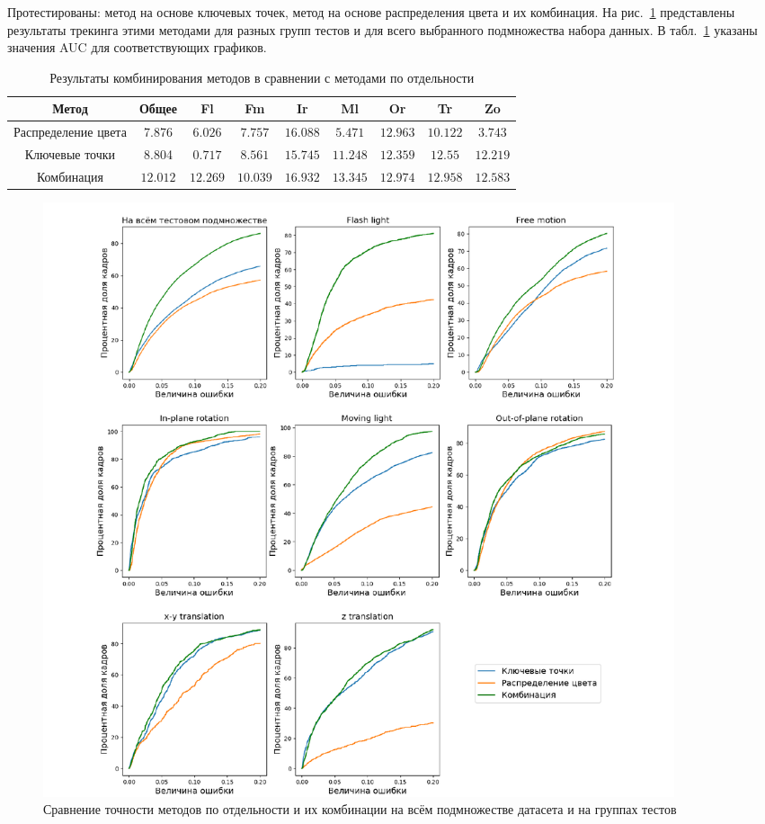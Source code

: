Протестированы: метод на основе ключевых точек, метод на основе
распределения цвета и их комбинация.
На рис.~\ref{fig:combining-plots} представлены результаты трекинга этими
методами для разных групп тестов и для всего выбранного подмножества набора
данных.
В табл.~\ref{tab:combine} указаны значения AUC для соответствующих графиков.

\begin{table}[h]
\caption{\label{tab:combine}Результаты комбинирования методов в сравнении с
методами по отдельности}
\begin{center}
\begin{tabular}{|c|c|c|c|c|c|c|c|c|}
\hline
Метод & Общее & Fl & Fm & Ir & Ml & Or & Tr & Zo \\
\hline
Распределение цвета & 7.876 & $6.026$ & $7.757$ & $16.088$ & $5.471$ & $12.963$
&
$10.122$ & $3.743$ \\
\hline
Ключевые точки & 8.804 & $0.717$ & $8.561$ & $15.745$ & $11.248$ & $12.359$ &
$12.55$
&$12.219$ \\
\hline
Комбинация & $\mathbf{12.012}$ & $\mathbf{12.269}$ & $\mathbf{10.039}$ &
$\mathbf{16.932}$ &
$\mathbf{13.345}$ & $\mathbf{12.974}$ & $\mathbf{12.958}$ &
$\mathbf{12.583}$ \\
\hline
\end{tabular}
\end{center}
\end{table}

\begin{figure}
\centering
\includegraphics[width=0.9\textwidth]{fig/Combining.pdf}
\caption{
Сравнение точности методов по отдельности и их комбинации на всём подмножестве
датасета и на группах тестов
}
\label{fig:combining-plots}
\end{figure}

